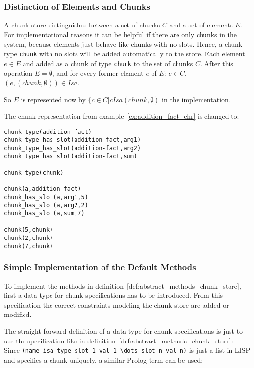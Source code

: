 \subsubsection{Distinction of Elements and Chunks}

A chunk store distinguishes between a set of chunks $C$ and a set of elements $E$. For implementational reasons it can be helpful if there are only chunks in the system, because elements just behave like chunks with no slots. Hence, a chunk-type \verb|chunk| with no slots will be added automatically to the store. Each element $e \in E$ and added as a chunk of type \verb|chunk| to the set of chunks $C$. After this operation $E = \emptyset$, and for every former element $e$ of $E$: $e \in C$, $(e,(chunk,\emptyset)) \in Isa$.

So $E$ is represented now by $\{ c \in C | c Isa (chunk,\emptyset)$ in the implementation.

\begin{example}
The chunk representation from example~\ref{ex:addition_fact_chr} is changed to:

\begin{lstlisting}
chunk_type(addition-fact)
chunk_type_has_slot(addition-fact,arg1)
chunk_type_has_slot(addition-fact,arg2)
chunk_type_has_slot(addition-fact,sum)

chunk_type(chunk)

chunk(a,addition-fact)
chunk_has_slot(a,arg1,5)
chunk_has_slot(a,arg2,2)
chunk_has_slot(a,sum,7)

chunk(5,chunk)
chunk(2,chunk)
chunk(7,chunk)
\end{lstlisting}

\end{example}


\subsubsection{Simple Implementation of the Default Methods}
\label{chunk_specification}

To implement the methods in definition~\ref{def:abstract_methods_chunk_store}, first a data type for chunk specifications has to be introduced. From this specification the correct constraints modeling the chunk-store are added or modified.

The straight-forward definition of a data type for chunk specifications is just to use the specification like in definition~\ref{def:abstract_methods_chunk_store}: Since \verb|(name isa type slot_1 val_1 \dots slot_n val_n)| is just a list in LISP and specifies a chunk uniquely, a similar Prolog term can be used:

